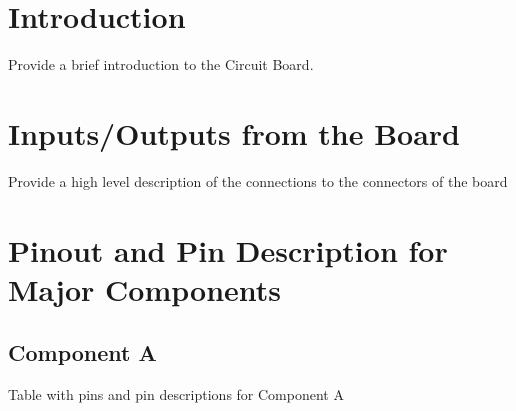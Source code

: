 \begin{titlepage}
    
    \vfill %
  
  \end{titlepage}
  
  
  \tableofcontents
  \listoffigures
  \listoftables
  
  
  \section{Introduction}
  Provide a brief introduction to the Circuit Board. 
  
  \section{Inputs/Outputs from the Board}
  Provide a high level description of the connections to the connectors of the board
  
  \section{Pinout and Pin Description for Major Components}

  \subsection{Component A}
  \begin{table}[H]
    \begin{center}
      \caption{Table with pins and pin descriptions for Component A}
      \label{tab:ComponentA}
    \end{center}
  \end{table}

